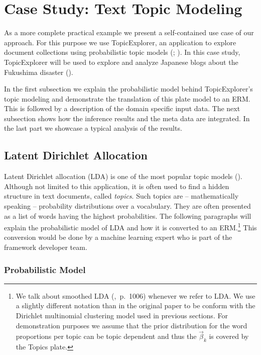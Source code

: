 \section{Case Study: Text Topic Modeling}\label{sec:casestudy}

As a more complete practical example we present a self-contained use case of our approach. For this purpose we use TopicExplorer, an application to explore document collections using probabilistic topic models (\cite{hinneburg2014topic}; \cite{hinneburg2012topicexplorer}). In this case study, TopicExplorer will be used to explore and analyze Japanese blogs about the Fukushima disaster (\cite{ines2011fukushima}).

In the first subsection we explain the probabilistic model behind TopicExplorer's topic modeling and demonstrate the translation of this plate model to an ERM. This is followed by a description of the domain specific input data. The next subsection shows how the inference results and the meta data are integrated. In the last part we showcase a typical analysis of the results.

\subsection{Latent Dirichlet Allocation}

Latent Dirichlet allocation (LDA) is one of the most popular topic models (\cite{blei2003latent}). Although not limited to this application, it is often used to find a hidden structure in text documents, called \emph{topics}. Such topics are -- mathematically speaking -- probability distributions over a vocabulary. They are often presented as a list of words having the highest probabilities. The following paragraphs will explain the probabilistic model of LDA and how it is converted to an ERM.\footnote{We talk about smoothed LDA (\cite{blei2003latent},~p.~1006) whenever we refer to LDA. We use a slightly different notation than in the original paper to be conform with the Dirichlet multinomial clustering model used in previous sections. For demonstration purposes we assume that the prior distribution for the word proportions per topic can be topic dependent and thus the $\vec \beta_k$ is covered by the Topics plate.} This conversion would be done by a machine learning expert who is part of the framework developer team.

\subsubsection{Probabilistic Model}

